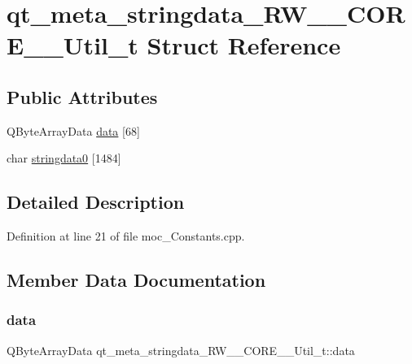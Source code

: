 \hypertarget{structqt__meta__stringdata___r_w_____c_o_r_e_____util__t}{}\section{qt\+\_\+meta\+\_\+stringdata\+\_\+\+R\+W\+\_\+\+\_\+\+C\+O\+R\+E\+\_\+\+\_\+\+Util\+\_\+t Struct Reference}
\label{structqt__meta__stringdata___r_w_____c_o_r_e_____util__t}
\subsection*{Public Attributes}
\begin{DoxyCompactItemize}
\item 
Q\+Byte\+Array\+Data \hyperlink{structqt__meta__stringdata___r_w_____c_o_r_e_____util__t_aa724bdcd80f78b14e1fba1f9605d3a78}{data} \mbox{[}68\mbox{]}
\item 
char \hyperlink{structqt__meta__stringdata___r_w_____c_o_r_e_____util__t_ae4c649acc1dcaa7ab6a3292e3843a63e}{stringdata0} \mbox{[}1484\mbox{]}
\end{DoxyCompactItemize}


\subsection{Detailed Description}


Definition at line 21 of file moc\+\_\+\+Constants.\+cpp.



\subsection{Member Data Documentation}
\hypertarget{structqt__meta__stringdata___r_w_____c_o_r_e_____util__t_aa724bdcd80f78b14e1fba1f9605d3a78}{}\label{structqt__meta__stringdata___r_w_____c_o_r_e_____util__t_aa724bdcd80f78b14e1fba1f9605d3a78} 
\subsubsection{\texorpdfstring{data}{data}}
{\footnotesize\ttfamily Q\+Byte\+Array\+Data qt\+\_\+meta\+\_\+stringdata\+\_\+\+R\+W\+\_\+\+\_\+\+C\+O\+R\+E\+\_\+\+\_\+\+Util\+\_\+t\+::data}



